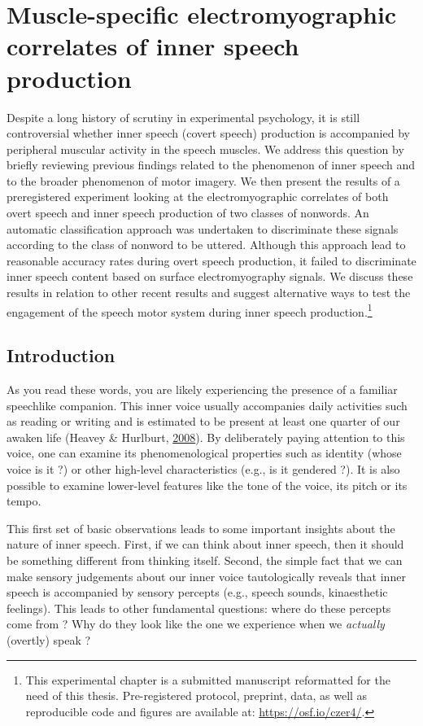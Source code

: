 \documentclass[a4paper,12pt,twoside,openright,oldfontcommands]{memoir}
\let\rmarkdownfootnote\footnote%
\def\footnote{\protect\rmarkdownfootnote}
\newcommand{\initial}[1]{
	\lettrine[lines=3,lhang=0.33,nindent=0em]{
		\color{gray}
     		{\textsc{#1}}}{}}
\begin{document}
\hypertarget{chap5}{%
\chapter{Muscle-specific electromyographic correlates of inner speech production}\label{chap5}}

\initial{D}espite a long history of scrutiny in experimental psychology, it is still controversial whether inner speech (covert speech) production is accompanied by peripheral muscular activity in the speech muscles. We address this question by briefly reviewing previous findings related to the phenomenon of inner speech and to the broader phenomenon of motor imagery. We then present the results of a preregistered experiment looking at the electromyographic correlates of both overt speech and inner speech production of two classes of nonwords. An automatic classification approach was undertaken to discriminate these signals according to the class of nonword to be uttered. Although this approach lead to reasonable accuracy rates during overt speech production, it failed to discriminate inner speech content based on surface electromyography signals. We discuss these results in relation to other recent results and suggest alternative ways to test the engagement of the speech motor system during inner speech production.\footnote{This experimental chapter is a submitted manuscript reformatted for the need of this thesis. Pre-registered protocol, preprint, data, as well as reproducible code and figures are available at: \url{https://osf.io/czer4/}.}

\hypertarget{introduction-2}{%
\section{Introduction}\label{introduction-2}}

As you read these words, you are likely experiencing the presence of a familiar speechlike companion. This inner voice usually accompanies daily activities such as reading or writing and is estimated to be present at least one quarter of our awaken life (Heavey \& Hurlburt, \protect\hyperlink{ref-heavey_phenomena_2008}{2008}). By deliberately paying attention to this voice, one can examine its phenomenological properties such as identity (whose voice is it ?) or other high-level characteristics (e.g., is it gendered ?). It is also possible to examine lower-level features like the tone of the voice, its pitch or its tempo.

This first set of basic observations leads to some important insights about the nature of inner speech. First, if we can think about inner speech, then it should be something different from thinking itself. Second, the simple fact that we can make sensory judgements about our inner voice tautologically reveals that inner speech is accompanied by sensory percepts (e.g., speech sounds, kinaesthetic feelings). This leads to other fundamental questions: where do these percepts come from ? Why do they look like the one we experience when we \emph{actually} (overtly) speak ?
\end{document}
